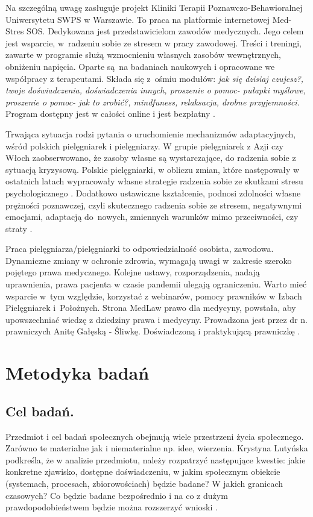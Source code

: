 \documentclass[a4paper,12pt,twoside,openright]{mwrep}
\begin{document}
Na szczególną uwagę zasługuje projekt Kliniki Terapii Poznawczo-Behawioralnej Uniwersytetu SWPS w Warszawie. To praca na platformie internetowej Med-Stres SOS. Dedykowana jest przedstawicielom zawodów medycznych. Jego celem jest wsparcie, w~radzeniu sobie ze stresem w pracy zawodowej. Treści i treningi, zawarte w programie służą wzmocnieniu własnych zasobów wewnętrznych, obniżeniu napięcia. Oparte są~na badaniach naukowych i opracowane we współpracy z terapeutami. Składa się z~ośmiu modułów: \textit{jak się dzisiaj czujesz?, twoje doświadczenia, doświadczenia innych, proszenie o pomoc- pułapki myślowe, proszenie o pomoc- jak to zrobić?, mindfuness, relaksacja, drobne przyjemności}. Program dostępny jest w całości online i jest bezpłatny \cite{projekt}.

Trwająca sytuacja rodzi pytania o uruchomienie mechanizmów adaptacyjnych, wśród polskich pielęgniarek i pielęgniarzy. W grupie pielęgniarek z Azji czy Włoch zaobserwowano, że zasoby własne są wystarczające, do radzenia sobie z sytuacją kryzysową. Polskie pielęgniarki, w obliczu zmian, które następowały w ostatnich latach wypracowały własne strategie radzenia sobie ze skutkami stresu psychologicznego \cite{covid}. Dodatkowo ustawiczne kształcenie, podnosi zdolności własne prężności poznawczej, czyli skutecznego radzenia sobie ze stresem, negatywnymi emocjami, adaptacją do~nowych, zmiennych warunków mimo przeciwności, czy straty \cite{preznosc}. 
 
Praca pielęgniarza/pielęgniarki to odpowiedzialność osobista, zawodowa. Dynamiczne zmiany w ochronie zdrowia, wymagają uwagi w~zakresie szeroko pojętego prawa medycznego. Kolejne ustawy, rozporządzenia, nadają uprawnienia, prawa pacjenta w czasie pandemii ulegają ograniczeniu. Warto mieć wsparcie w~tym względzie, korzystać z webinarów, pomocy prawników w Izbach Pielęgniarek i~Położnych. Strona MedLaw prawo dla medycyny, powstała, aby upowszechniać wiedzę z dziedziny prawa i medycyny. Prowadzona jest przez dr n. prawniczych Anitę Gałęską - Śliwkę. Doświadczoną i praktykującą prawniczkę \cite{anita}.


\chapter{Metodyka badań}

\section{Cel badań.}
Przedmiot i cel badań społecznych obejmują wiele przestrzeni życia społecznego. Zarówno te materialne jak i niematerialne np. idee, wierzenia. Krystyna Lutyńska podkreśla, że w analizie przedmiotu, należy rozpatrzyć następujące kwestie: jakie konkretne zjawisko, dostępne doświadczeniu, w jakim społecznym obiekcie (systemach, procesach, zbiorowościach) będzie badane? W jakich granicach czasowych? Co będzie badane bezpośrednio i na co z dużym prawdopodobieństwem będzie można rozszerzyć wnioski \cite{krys}.
\end{document}
